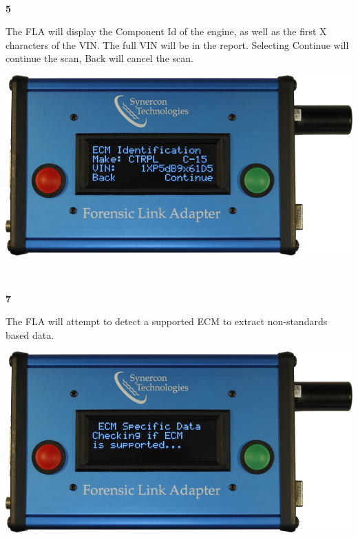 \documentclass[11pt, oneside]{book}
\begin{document}
\\[\baselineskip]
\noindent\begin{minipage}{0.45\textwidth}%
\begin{center}
\textbf{5}\\[\baselineskip]
\end{center}
The FLA will display the Component Id of the engine, as well as the first X characters of the VIN. The full VIN will be in the report. Selecting Continue will continue the scan, Back will cancel the scan.
\end{minipage}%
\hfill%
\begin{minipage}{0.45\textwidth}
\includegraphics[width=\linewidth]{../media/fla_screens/ethernet_and_others/veh_scan/comp_id}
\end{minipage}
\\[\baselineskip]
\noindent\begin{minipage}{0.45\textwidth}%
\begin{center}
\textbf{7}\\[\baselineskip]
\end{center}
The FLA will attempt to detect a supported ECM to extract non-standards based data.
\end{minipage}%
\hfill%
\begin{minipage}{0.45\textwidth}
\includegraphics[width=\linewidth]{../media/fla_screens/ethernet_and_others/veh_scan/check_ecm}
\end{minipage}
\end{document}
